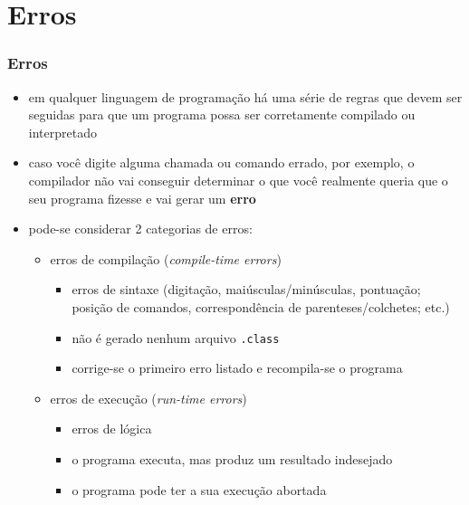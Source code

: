 \documentclass[aspectratio=169]{beamer}
\begin{document}
\section{Erros}

\begin{frame}\frametitle{Erros}
\begin{itemize}
	\item em qualquer linguagem de programação há uma série de regras que devem ser seguidas para que um programa possa ser corretamente compilado ou interpretado\\
	\item caso você digite alguma chamada ou comando errado, por exemplo, o compilador não vai conseguir determinar o que você realmente queria que o seu programa fizesse e vai gerar um \textbf{erro}
	\item pode-se considerar 2 categorias de erros:
	\begin{itemize}
		\item erros de compilação (\emph{compile-time errors})
		\begin{itemize}
			\item erros de sintaxe (digitação, maiúsculas/minúsculas, pontuação; posição de comandos, correspondência de parenteses/colchetes; etc.)
			\item não é gerado nenhum arquivo \texttt{.class}		
			\item corrige-se o primeiro erro listado e recompila-se o programa
		\end{itemize}
		\item erros de execução (\emph{run-time errors})
		\begin{itemize}
			\item erros de lógica
			\item o programa executa, mas produz um resultado indesejado
			\item o programa pode ter a sua execução abortada
		\end{itemize}
	\end{itemize}
\end{itemize}
\end{frame}
\end{document}
